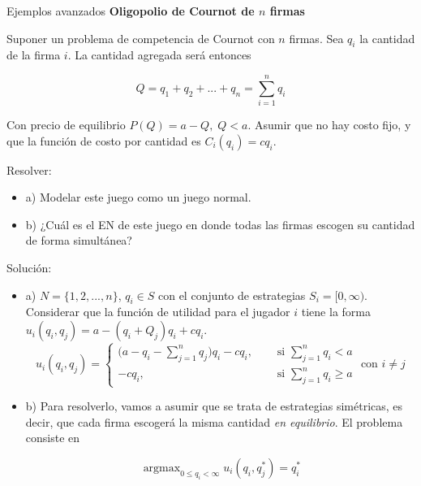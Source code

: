 \documentclass[12pt]{scrartcl}
\theoremstyle{definition}
\DeclareMathOperator*{\argmax}{argmax}
\newenvironment{myitemize}
{ \begin{itemize}
		\setlength{\itemsep}{0pt}
		\setlength{\parskip}{0pt}
		\setlength{\parsep}{0pt}     }
	{ \end{itemize}                  }
\begin{document}
\begin{exbox}{Ejemplos avanzados}
    \textbf{Oligopolio de Cournot de $n$ firmas}
    
    Suponer un problema de competencia de Cournot con $n$ firmas. Sea $q_i$ la cantidad de la firma $i$. La cantidad agregada será entonces
    
    \begin{equation}
        Q = q_1 + q_2 + ... + q_n = \sum_{i=1}^n q_i
    \end{equation}
    
    Con precio de equilibrio $P(Q)=a-Q,\;Q<a$. Asumir que no hay costo fijo, y que la función de costo por cantidad es $C_i(q_i)=cq_i$. 
    
    Resolver:
    
    \begin{myitemize}
        \item[a)] Modelar este juego como un juego normal.
        \item[b)] ¿Cuál es el EN de este juego en donde todas las firmas escogen su cantidad de forma simultánea?
    \end{myitemize}
    
    
    Solución:
    
    \begin{myitemize}
        \item[a)] $N=\{1, 2, ..., n\}$, $q_i \in S$ con el conjunto de estrategias $S_i=[0, \infty)$. Considerar que la función de utilidad para el jugador $i$ tiene la forma $u_i(q_i,q_{j})=a-(q_i + Q_{j})q_i+cq_i$.
    \begin{equation}
        u_i(q_i, q_j)=\begin{cases}
            \Big(a - q_i - \sum\limits_{j=1}^n q_j\Big)q_i -cq_i,\quad & \text{ si } \sum\limits_{j=1}^nq_i < a\\
            -cq_i, \quad & \text{ si } \sum\limits_{j=1}^nq_i \geq a
        \end{cases}
        \text{ con } i\neq j
    \end{equation}
    
        \item[b)] Para resolverlo, vamos a asumir que se trata de estrategias simétricas, es decir, que cada firma escogerá la misma cantidad \textit{en equilibrio}. El problema consiste en
        
        \[\argmax_{0 \leq q_i < \infty}u_i(q_i, q_j^*)=q_i^*\]
        

\end{myitemize}
\end{exbox}
\end{document}
